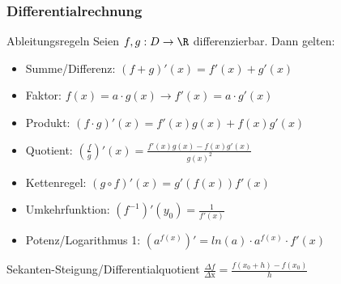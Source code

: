 \subsubsection{Differentialrechnung}

\begin{concept}{Ableitungsregeln}
    Seien $f,g: D \to \R$  differenzierbar. Dann gelten:
    \begin{itemize}
        \item Summe/Differenz: $(f + g)'(x) = f'(x) + g'(x)$
        \item Faktor: $f(x)=a\cdot g(x) \rightarrow f'(x)=a \cdot g'(x) $
        \item Produkt: $(f \cdot g)'(x) = f'(x)g(x) + f(x)g'(x)$
        \item Quotient: $(\frac{f}{g})'(x) = \frac{f'(x) g(x) - f(x) g'(x)}{g(x)^2}$
        \item Kettenregel: $(g \circ f)' (x) = g'(f(x)) f'(x)$
        \item Umkehrfunktion: $(f^{-1})'(y_0) = \frac{1}{f'(x)}$
        \item Potenz/Logarithmus 1: 
        $(a^{f(x)})' = ln(a) \cdot a^{f(x)} \cdot f'(x)$

    \end{itemize}
\end{concept}

\begin{theorem}{Sekanten-Steigung/Differentialquotient}
    $\frac{\Delta f}{\Delta \mathrm{x}}=\frac{f(x_{0}+h)-f(x_{0})}{h}$
\end{theorem}

\begin{comment}
\begin{corollary}{Krümmung}
    Zusammenhang zwischen 2. Ableitung und Krümmung:
    \begin{itemize}
      \item $f^{\prime \prime}(x_{0})>0$ Konvex (Nach links/oben gekrümmt)
      \item $f^{\prime \prime}(x_{0})<0$ Konkav (Nach rechts/unten gekrümmt)
      \item $f^{\prime \prime}(x_{0})=0$ Keine eindeutige Krümmung
    \end{itemize}
    Bmk: Die Summe zweier konvexer Funktionen ist konvex. (konkav analog)
\end{corollary}
\end{comment}

